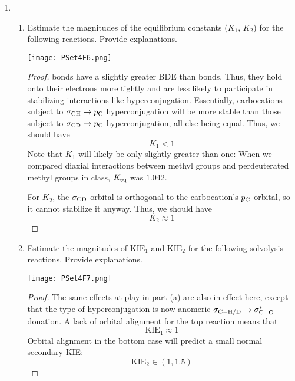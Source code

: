 \documentclass[../psets.tex]{subfiles}
\begin{document}
\begin{enumerate}
\begin{enumerate}
\begin{enumerate}[label={\roman*)}]
        \end{enumerate}
    \end{enumerate}
    \pagebreak
    \item 
    \begin{enumerate}
        \item Estimate the magnitudes of the equilibrium constants ($K_1$, $K_2$) for the following reactions. Provide explanations.
        \begin{center}
            \texttt{[image: PSet4F6.png]}
        \end{center}
        \begin{proof}
             bonds have a slightly greater BDE than  bonds. Thus, they hold onto their electrons more tightly and are less likely to participate in stabilizing interactions like hyperconjugation. Essentially, carbocations subject to $\sigma_{\ce{CH}}\to p_{\ce{C}}$ hyperconjugation will be more stable than those subject to $\sigma_{\ce{CD}}\to p_{\ce{C}}$ hyperconjugation, all else being equal. Thus, we should have
            \begin{equation*}
                \boxed{K_1 < 1}
            \end{equation*}
            Note that $K_1$ will likely be only slightly greater than one: When we compared diaxial interactions between methyl groups and perdeuterated methyl groups in class, $K_\textup{eq}$ was $1.042$.\par
            For $K_2$, the $\sigma_{\ce{CD}}$-orbital is orthogonal to the carbocation's $p_{\ce{C}}$ orbital, so it cannot stabilize it anyway. Thus, we should have
            \begin{equation*}
                \boxed{K_2 \approx 1}
            \end{equation*}
        \end{proof}
        \item Estimate the magnitudes of $\text{KIE}_1$ and $\text{KIE}_2$ for the following solvolysis reactions. Provide explanations.
        \begin{center}
            \texttt{[image: PSet4F7.png]}
        \end{center}
        \begin{proof}
            The same effects at play in part (a) are also in effect here, except that the type of hyperconjugation is now anomeric $\sigma_{\ce{C-H/D}}\to\sigma^*_{\ce{C-O}}$ donation. A lack of orbital alignment for the top reaction means that
            \begin{equation*}
                \boxed{\text{KIE}_1 \approx 1}
            \end{equation*}
            Orbital alignment in the bottom case will predict a small normal secondary KIE:
            \begin{equation*}
                \boxed{\text{KIE}_2 \in (1,1.5)}
            \end{equation*}
        \end{proof}
    \end{enumerate}
\end{enumerate}
\end{document}
